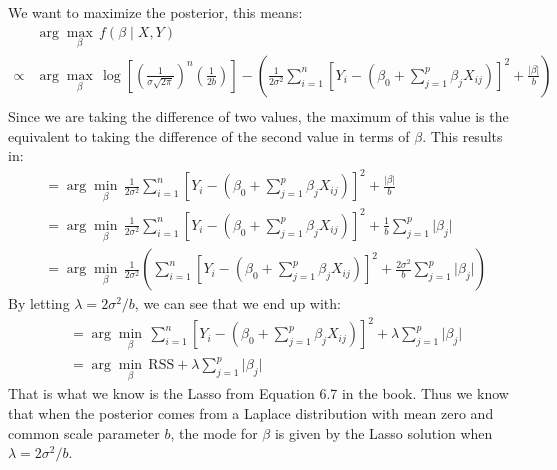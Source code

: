 \documentclass[10pt]{article}
\begin{document}
\qquad We want to maximize the posterior, this means:
\begin{align*}
    &\arg\max_\beta \, f(\beta \mid X, Y)\\
    \propto &
    \arg\max_\beta
    \,
    \log
    \left[
        \left(
            \frac{
                1
            }{
                \sigma \sqrt{2\pi}
            }
        \right)^n
        \left(
            \frac{
                1
            }{
                2b
            }
        \right)
    \right]
    -
    \left(
        \frac{
            1
        }{
            2\sigma^2
        }
        \sum_{i = 1}^{n}
        \left[
            Y_i - (\beta_0 + \sum_{j = 1}^{p} \beta_j X_{ij})
        \right]^2
        +
        \frac{
            \lvert \beta \rvert
        }{
            b
            }
    \right)
    \\
\end{align*}
\qquad Since we are taking the difference of two values, the maximum of this value is the equivalent to taking the difference of the second value in terms of $\beta$. This results in:
\begin{align*}
    &=
    \arg\min_\beta
    \,
    \frac{
        1
    }{
        2\sigma^2
    }
    \sum_{i = 1}^{n}
    \left[
        Y_i - (\beta_0 + \sum_{j = 1}^{p} \beta_j X_{ij})
    \right]^2
    +
    \frac{
        \lvert \beta \rvert
    }{
        b
    }
    \\
    &=
    \arg\min_\beta
    \,
    \frac{
        1
    }{
        2\sigma^2
    }
    \sum_{i = 1}^{n}
    \left[
        Y_i - (\beta_0 + \sum_{j = 1}^{p} \beta_j X_{ij})
    \right]^2
    +
    \frac{
        1
    }{
        b
    }
    \sum_{j = 1}^{p} \lvert \beta_j \rvert
    \\
    &=
    \arg\min_\beta
    \,
    \frac{
        1
    }{
        2\sigma^2
    }
    \left(
        \sum_{i = 1}^{n}
        \left[
            Y_i - (\beta_0 + \sum_{j = 1}^{p} \beta_j X_{ij})
        \right]^2
        +
        \frac{
            2\sigma^2
        }{
            b
        }
        \sum_{j = 1}^{p} \lvert \beta_j \rvert
    \right)
\end{align*}
\qquad By letting $\lambda = 2\sigma^2/b$, we can see that we end up with:
\begin{align*}
    &=
    \arg\min_\beta
    \,
    \sum_{i = 1}^{n}
    \left[
        Y_i - (\beta_0 + \sum_{j = 1}^{p} \beta_j X_{ij})
    \right]^2
    +
    \lambda
    \sum_{j = 1}^{p} \lvert \beta_j \rvert
    \\
    &=
    \arg\min_\beta
    \,
    \text{RSS}
    +
    \lambda
    \sum_{j = 1}^{p} \lvert \beta_j \rvert
\end{align*}
\qquad That is what we know is the Lasso from Equation 6.7 in the book. Thus we know that when the posterior comes from a Laplace distribution with mean zero and common scale parameter $b$, the mode for $\beta$ is given by the Lasso solution when $\lambda = 2\sigma^2 / b$. 
\end{document}
